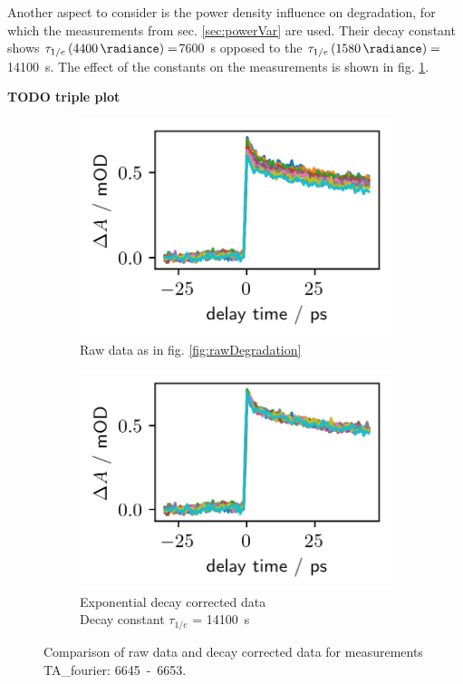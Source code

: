 \documentclass[twoside,openright]{scrreprt}
\begin{document}
Another aspect to consider is the power density influence on degradation, for which the measurements from sec. \ref{sec:powerVar} are used.  Their decay constant shows $\tau_{1/e}\left(\SI{4400}{\radiance}\right)=$\SI{7600}{\second}  opposed to the $\tau_{1/e}\left(\SI{1580}{\radiance}\right)=$\SI{14100}{\second}. The effect of the constants on the measurements is shown in fig. \ref{fig:powerVarCorrection}.

\textbf{TODO triple plot}
\begin{figure}[hbtp]
\centering
\begin{subfigure}[t]{0.4\linewidth}
\centering
\includegraphics[scale=1]{images/DegradationRAWPump653Probe493-Graph.png}
\caption{Raw data as in fig. \ref{fig:rawDegradation}}
\end{subfigure}
\hfill
\begin{subfigure}[t]{0.4\linewidth}
\centering
\includegraphics[scale=1]{images/DegradationCorrectedPump653Probe493-Graph.png}
\caption{Exponential decay corrected data\\
Decay constant $\tau_{1/e}$ = \SI{14100}{\second}}
\end{subfigure}
\caption{Comparison of raw data and decay corrected data for measurements TA\_fourier: \mbox{6645 - 6653}.\label{fig:powerVarCorrection}}
\end{figure}
\end{document}
